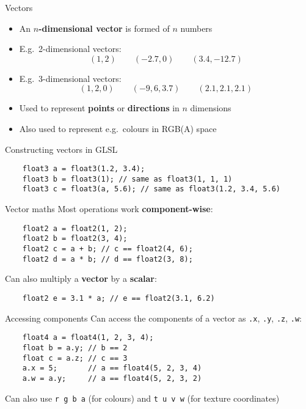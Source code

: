 \begin{frame}{Vectors}
	\begin{itemize}
		\item An \textbf{$n$-dimensional vector} is formed of $n$ numbers
		\pause\item E.g.\ 2-dimensional vectors:
		$$ (1, 2) \qquad (-2.7, 0) \qquad (3.4, -12.7) $$
		\pause\item E.g.\ 3-dimensional vectors:
		$$ (1, 2, 0) \qquad (-9, 6, 3.7) \qquad (2.1, 2.1, 2.1) $$
		\pause\item Used to represent \textbf{points} or \textbf{directions} in $n$ dimensions
		\pause\item Also used to represent e.g.\ colours in RGB(A) space
	\end{itemize}
\end{frame}

\begin{frame}[fragile]{Constructing vectors in GLSL}
	\begin{lstlisting}
	float3 a = float3(1.2, 3.4);
	float3 b = float3(1); // same as float3(1, 1, 1)
	float3 c = float3(a, 5.6); // same as float3(1.2, 3.4, 5.6)
	\end{lstlisting}
\end{frame}

\begin{frame}[fragile]{Vector maths}
	\pause Most operations work \textbf{component-wise}:
	\begin{lstlisting}
	float2 a = float2(1, 2);
	float2 b = float2(3, 4);
	float2 c = a + b; // c == float2(4, 6);
	float2 d = a * b; // d == float2(3, 8);
	\end{lstlisting}
	\pause Can also multiply a \textbf{vector} by a \textbf{scalar}:
	\begin{lstlisting}
	float2 e = 3.1 * a; // e == float2(3.1, 6.2)
	\end{lstlisting}
\end{frame}

\begin{frame}[fragile]{Accessing components}
	\pause Can access the components of a vector as \lstinline{.x}, \lstinline{.y}, \lstinline{.z}, \lstinline{.w}:
	\pause\begin{lstlisting}
	float4 a = float4(1, 2, 3, 4);
	float b = a.y; // b == 2
	float c = a.z; // c == 3
	a.x = 5;       // a == float4(5, 2, 3, 4)
	a.w = a.y;     // a == float4(5, 2, 3, 2)
	\end{lstlisting}
	\pause Can also use \lstinline{r g b a} (for colours) and \lstinline{t u v w} (for texture coordinates)
\end{frame}

